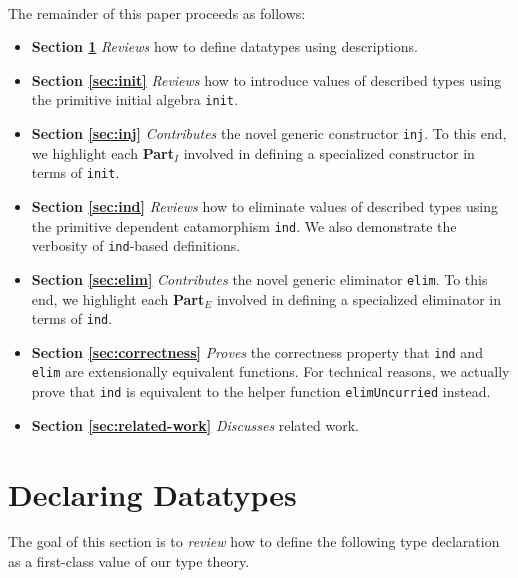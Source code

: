 \documentclass[preprint,nonatbib]{sigplanconf}
\newcommand{\refsec}[1]{Section \ref{sec:#1}}
\begin{document}
\paragraph{}
The remainder of this paper proceeds as follows:

\begin{itemize}
\item{\bf{\refsec{background}}}
{\it Reviews} how to define datatypes using descriptions.

\item{\bf{\refsec{init}}}
{\it Reviews} how to introduce values of described types using the
primitive initial algebra {\tt init}.

\item{\bf{\refsec{inj}}}
{\it Contributes} the novel generic constructor {\tt inj}. To this
end, we highlight each {\bf Part$_I$} involved in defining a specialized
constructor in terms of {\tt init}.

\item{\bf{\refsec{ind}}}
{\it Reviews} how to eliminate values of described types using the
primitive dependent catamorphism {\tt ind}. We also demonstrate
the verbosity of {\tt ind}-based definitions.

\item{\bf{\refsec{elim}}}
{\it Contributes} the novel generic eliminator {\tt elim}. To this
end, we highlight each {\bf Part$_E$} involved in defining a specialized
eliminator in terms of {\tt ind}.

\item{\bf{\refsec{correctness}}}
{\it Proves} the correctness property that {\tt ind} and {\tt elim}
are extensionally equivalent functions. For technical reasons, we actually prove that
{\tt ind} is equivalent to the helper function {\tt elimUncurried} instead.

\item{\bf{\refsec{related-work}}}
{\it Discusses} related work.


\end{itemize}



\section{Declaring Datatypes}
\label{sec:background}

The goal of this section is to {\it review} how to define the following type
declaration as a first-class value of our type theory. 
\end{document}
